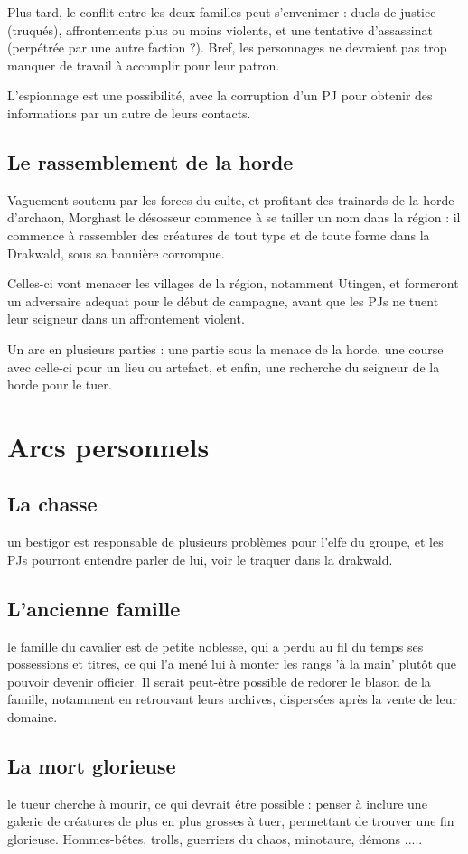 \documentclass[10pt,a4paper]{book}
\begin{document}
Plus tard, le conflit entre les deux familles peut s'envenimer : duels de justice (truqués), affrontements plus ou moins violents, et une tentative d'assassinat (perpétrée par une autre faction ?). Bref, les personnages ne devraient pas trop manquer de travail à accomplir pour leur patron.

L'espionnage est une possibilité, avec la corruption d'un PJ pour obtenir des informations par un autre de leurs contacts.

\subsection{Le rassemblement de la horde}
Vaguement soutenu par les forces du culte, et profitant des trainards de la horde d'archaon, Morghast le désosseur commence à se tailler un nom dans la région : il commence à rassembler des créatures de tout type et de toute forme dans la Drakwald, sous sa bannière corrompue.

Celles-ci vont menacer les villages de la région, notamment Utingen, et formeront un adversaire adequat pour le début de campagne, avant que les PJs ne tuent leur seigneur dans un affrontement violent. 

Un arc en plusieurs parties : une partie sous la menace de la horde, une course avec celle-ci pour un lieu ou artefact, et enfin, une recherche du seigneur de la horde pour le tuer.
\section{Arcs personnels}
\subsection{La chasse}
un bestigor est responsable de plusieurs problèmes pour l'elfe du groupe, et les PJs pourront entendre parler de lui, voir le traquer dans la drakwald.
\subsection{L'ancienne famille}
le famille du cavalier est de petite noblesse, qui a perdu au fil du temps ses possessions et titres, ce qui l'a mené lui à monter les rangs 'à la main' plutôt que pouvoir devenir officier. Il serait peut-être possible de redorer le blason de la famille, notamment en retrouvant leurs archives, dispersées après la vente de leur domaine.
\subsection{La mort glorieuse}
le tueur cherche à mourir, ce qui devrait être possible : penser à inclure une galerie de créatures de plus en plus grosses à tuer, permettant de trouver une fin glorieuse. Hommes-bêtes, trolls, guerriers du chaos, minotaure, démons .....
\end{document}

